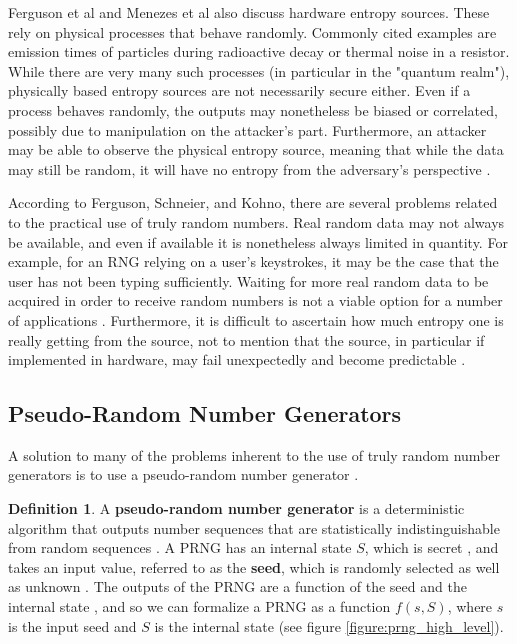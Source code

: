 \documentclass[12pt, titlepage]{report}
\theoremstyle{definition}
\newtheorem{definition}{Definition}
\begin{document}
Ferguson et al and Menezes et al also discuss hardware entropy sources. These rely on physical processes that behave randomly. Commonly cited examples are emission times of particles during radioactive decay or thermal noise in a resistor. While there are very many such processes (in particular in the "quantum realm"), physically based entropy sources are not necessarily secure either. Even if a process behaves randomly, the outputs may nonetheless be biased or correlated, possibly due to manipulation on the attacker's part. Furthermore, an attacker may be able to observe the physical entropy source, meaning that while the data may still be random, it will have no entropy from the adversary's perspective \cite[p. 138-139]{ferguson2010cryptography} \cite[p. 172]{menezes1996handbook}.

According to Ferguson, Schneier, and Kohno, there are several problems related to the practical use of truly random numbers. Real random data may not always be available, and even if available it is nonetheless always limited in quantity. For example, for an RNG relying on a user's keystrokes, it may be the case that the user has not been typing sufficiently. Waiting for more real random data to be acquired in order to receive random numbers is not a viable option for a number of applications \cite[p. 139]{ferguson2010cryptography}. Furthermore, it is difficult to ascertain how much entropy one is really getting from the source, not to mention that the source, in particular if implemented in hardware, may fail unexpectedly and become predictable \cite{ferguson2010cryptography}.



\subsection{Pseudo-Random Number Generators}
A solution to many of the problems inherent to the use of truly random number generators is to use a pseudo-random number generator \cite[p. 140]{ferguson2010cryptography}.

\begin{definition}
 A \textbf{pseudo-random number generator} is a deterministic algorithm that outputs number sequences that are statistically indistinguishable from random sequences \cite{menezes1996handbook}. A PRNG has an internal state $S$, which is secret \cite{kelsey1998cryptanalytic}, and takes an input value, referred to as the \textbf{seed}, which is randomly selected as well as unknown \cite[s. 1.1.4]{rukhin2001statistical}. The outputs of the PRNG are a function of the seed and the internal state \cite{kelsey1998cryptanalytic} \cite[s 1.1.4]{rukhin2001statistical}, and so we can formalize a PRNG as a function $f(s, S)$, where $s$ is the input seed and $S$ is the internal state (see figure \ref{figure:prng_high_level}).
\end{definition}
\end{document}

